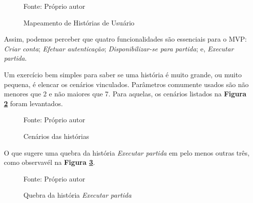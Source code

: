 \documentclass[12pt,a4paper,oneside,english,brazil]{article}
\begin{document}
      \begin{figure}[h]
        \centering
        \caption{Mapeamento de Histórias de Usuário}
        Fonte: Próprio autor\footnotemark
        \label{fig:fluxogeral}
      \end{figure}

      Assim, podemos perceber que quatro funcionalidades são essenciais para o
      MVP: \emph{Criar conta}; \emph{Efetuar autenticação};
      \emph{Disponibilizar-se para partida}; e, \emph{Executar partida}.

      Um exercício bem simples para saber se uma história é muito grande, ou
      muito pequena, é elencar os cenários vinculados. Parâmetros comumente
      usados são não menores que 2 e não maiores que 7. Para aquelas, os
      cenários listados na \textbf{Figura \ref{fig:cenarios-das-historias}}
      foram levantados.

      \begin{figure}[h]
        \centering
        \caption{Cenários das histórias}
        
        Fonte: Próprio autor
        \label{fig:cenarios-das-historias}
      \end{figure}

      O que sugere uma quebra da história \emph{Executar partida} em pelo menos
      outras três, como observavél na \textbf{Figura \ref{fig:executar-partida}}.

      \begin{figure}[h]
        \centering
        \caption{Quebra da história \emph{Executar partida}}
        
        Fonte: Próprio autor
        \label{fig:executar-partida}
      \end{figure}
\end{document}
